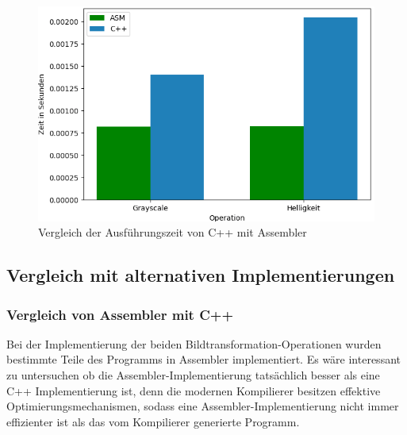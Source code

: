 \documentclass[11pt]{amsart}
\begin{document}



 
 


 \begin{figure}[thb!]
\includegraphics[scale=0.5]{images/asmVScpp.png}
\caption{Vergleich der Ausführungszeit von C++ mit Assembler}
\label{fig:asmVScpp}
\end{figure}

\subsection{Vergleich mit alternativen Implementierungen}


\subsubsection{Vergleich von Assembler mit C++} \label{asmVSc++}
Bei der Implementierung der beiden Bildtransformation-Operationen wurden bestimmte Teile des Programms in Assembler implementiert. Es wäre interessant zu untersuchen ob die Assembler-Implementierung tatsächlich besser als eine C++ Implementierung ist, denn die modernen Kompilierer besitzen effektive Optimierungsmechanismen, sodass eine Assembler-Implementierung nicht immer effizienter ist als das vom Kompilierer generierte Programm.
\end{document}
